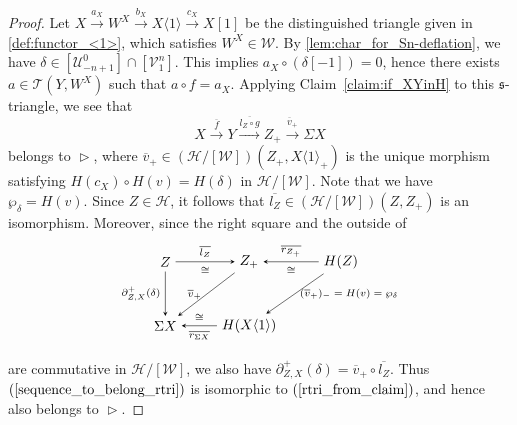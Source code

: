 \documentclass[a4paper,reqno,10pt]{amsart}
\DeclareRobustCommand{\darkblueedit}[1]{#1}
\theoremstyle{definition}
\theoremstyle{definition}
\theoremstyle{definition}
\theoremstyle{definition}
\theoremstyle{plain}
\newcommand{\fs}{\mathfrak{s}}
\newcommand{\CH}{\mathcal{H}}
\newcommand{\CT}{\mathcal{T}}
\newcommand{\CU}{\mathcal{U}}
\newcommand{\CV}{\mathcal{V}}
\newcommand{\CW}{\mathcal{W}}
\begin{document}
\begin{proof}
\color{blue}
Let $X\xrightarrow{a_X}W^X\xrightarrow{b_X}X\langle 1\rangle\xrightarrow{c_X}X[1]$ be the distinguished
triangle given in \cref{def:functor_<1>}, which satisfies $W^X\in\CW$.
By \cref{lem:char_for_Sn-deflation}, we have $\delta\in[\CU_{-n+1}^0]\cap[\CV_1^n]$. This implies $a_X\circ (\delta[-1])=0$, hence there exists $a\in\CT(Y,W^X)$ such that $a\circ f=a_X$.
\normalcolor
Applying Claim~\ref{claim:if_XYinH} to this $\fs$-triangle, we see that
\begin{equation}\label{rtri_from_claim}
X\xrightarrow{\overline{f}}Y\xrightarrow{\overline{l_Z\circ g}}Z_+\xrightarrow{\overline{v}_+}\Sigma X
\end{equation}
belongs to $\vartriangleright$, where
$\overline{v}_+\in(\CH/[\CW])(Z_+,X\langle1\rangle_+)$ is the unique morphism satisfying $H(c_X)\circ H(v)=H(\delta)$ in $\CH/[\CW]$. 
Note that we have $\wp_{\delta}=H(v)$.
Since $Z\in\CH$, it follows that $\overline{l_Z}\in(\CH/[\CW])(Z,Z_+)$ is an isomorphism. \darkblueedit{Moreover, since the right square and the outside of}
\color{blue}
\[
\begin{tikzpicture}[>=stealth]
\node (0) at (-2.2,0.8) {$Z$};
\node (1) at (-0.1,0.8) {$Z_+$};
\node (2) at (2.2,0.8) {$H(Z)$};
\node (3) at (-2.2,-0.8) {$\Sigma X$};
\node (4) at (-0.1,-0.8) {$H(X\langle1\rangle)$};
\draw[->] (0) -- node[above,font=\scriptsize] {$\overline{l_Z}$}node[below,font=\scriptsize] {$\cong$}  (1);
\draw[->] (2) -- node[above,font=\scriptsize] {$\overline{r_{Z_+}}$} node[below,font=\scriptsize] {$\cong$} (1);
\draw[->] (0) -- node[left,font=\scriptsize] {$\partial^+_{Z,X}(\delta)$} (3);
\draw[->] (1) -- node[left,font=\scriptsize] {$\overline{v}_+$} (3);
\draw[->] (2) -- node[right,font=\scriptsize] {$(\overline{v}_+)_-=H(v)=\wp_{\delta}$} (4);
\draw[->] (4) -- node[below,font=\scriptsize] {$\overline{r_{\Sigma X}}$} node[above,font=\scriptsize] {$\cong$} (3);
\end{tikzpicture}
\]
\normalcolor
are commutative in $\CH/[\CW]$, we also have $\partial^+_{Z,X}(\delta)=\overline{v}_+\circ\overline{l_Z}$. %
Thus $(\ref{sequence_to_belong_rtri})$ is isomorphic to $(\ref{rtri_from_claim})$, and hence also 
\color{blue}
belongs to 
\normalcolor
$\vartriangleright$.   
\end{proof}
\end{document}
